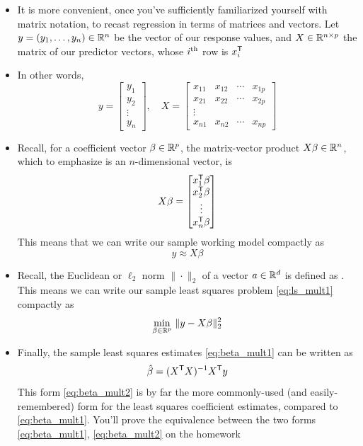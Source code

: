 \documentclass{article}
\begin{document}
\begin{itemize}
\item It is more convenient, once you've sufficiently familiarized yourself with
  matrix notation, to recast regression in terms of matrices and vectors. Let $y 
  = (y_1, \dots, y_n) \in \mathbb{R}^n$ be the vector of our response values, and $X \in
  \mathbb{R}^{n \times p}$ the matrix of our predictor vectors, whose $i^{\textnormal{th}}$ row is
  $x_i^{\mathsf{T}}$    

\item In other words,
  \[
  y = \begin{bmatrix} 
    y_1 \\ y_2 \\ \vdots \\ y_n 
  \end{bmatrix}, \quad 
  X = \begin{bmatrix} 
    x_{11} & x_{12} & \cdots & x_{1p} \\
    x_{21} & x_{22} & \cdots & x_{2p} \\
    \vdots & & & \\
    x_{n1} & x_{n2} & \cdots & x_{np} 
    \end{bmatrix}
  \]

\item Recall, for a coefficient vector $\beta \in \mathbb{R}^p$, the matrix-vector
  product $X \beta \in \mathbb{R}^n$, which to emphasize is an $n$-dimensional vector,
  is    
  \[
  X \beta = 
  \begin{bmatrix} 
    x_1^{\mathsf{T}} \beta \\ x_2^{\mathsf{T}} \beta \\ \vdots \\ x_n^{\mathsf{T}} \beta 
  \end{bmatrix}
  \]
  This means that we can write our sample working model compactly as
  \[
  y \approx X \beta
  \]

\item Recall, the Euclidean or $\ell_2$ norm $\|\cdot\|_2$ of a vector $a \in
  \mathbb{R}^d$ is defined as . This means we
  can write our sample least squares problem \eqref{eq:ls_mult1} compactly as  
  \begin{equation}
  \label{eq:ls_mult2}
  \min_{\beta \in \mathbb{R}^p} \, \|y - X \beta\|_2^2
  \end{equation}

\item Finally, the sample least squares estimates \eqref{eq:beta_mult1} can 
  be written as 
  \begin{equation}
  \label{eq:beta_mult2}
  \hat{\beta} = (X^{\mathsf{T}} X)^{-1} X^{\mathsf{T}} y  
  \end{equation}
  This form \eqref{eq:beta_mult2} is by far the more commonly-used (and
  easily-remembered) form for the least squares coefficient estimates, compared
  to \eqref{eq:beta_mult1}. You'll prove the equivalence between the two
  forms \eqref{eq:beta_mult1}, \eqref{eq:beta_mult2} on the homework 


\end{itemize}
\end{document}
